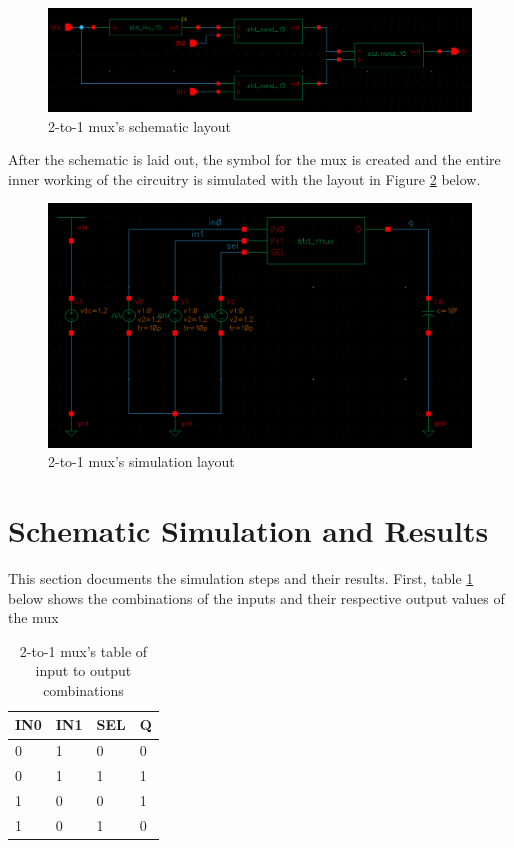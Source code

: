 \documentclass[letterpaper, 11pt]{article}
\begin{document}
\begin{figure}[htb!]
	\centering
	\includegraphics[width=1.0\linewidth]{mux_schematic_final.png}
	\caption{2-to-1 mux's schematic layout}
	\label{fig2}
\end{figure}

After the schematic is laid out, the symbol for the mux is created and the entire inner working of the circuitry is simulated with the layout in Figure \ref{fig3} below.

\begin{figure}[htb!]
	\centering
	\includegraphics[width=0.9\linewidth]{mux_sim_schematic.png}
	\caption{2-to-1 mux's simulation layout}
	\label{fig3}
\end{figure}

\section{Schematic Simulation and Results}
\label{sec:schematic_sim_and_res}

This section documents the simulation steps and their results. First, table \ref{table1} below shows the combinations of the inputs and their respective output values of the mux
\begin{table}[htb!]
	\centering
	\begin{tabular}{l|l|l|l}
		IN0 & IN1 & SEL & Q \\ \hline
		0 & 1 & 0 & 0 \\
		0 & 1 & 1 & 1 \\
		1 & 0 & 0 & 1 \\
		1 & 0 & 1 & 0
	\end{tabular}
	\caption{2-to-1 mux's table of input to output combinations}
	\label{table1}
\end{table}
\end{document}
